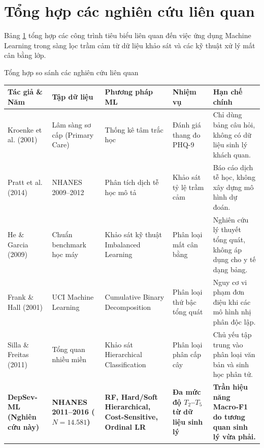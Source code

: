 \section{Tổng hợp các nghiên cứu liên quan}
\label{sec:nghien-cuu-lien-quan}

Bảng \ref{tab:related-works} tổng hợp các công trình tiêu biểu liên quan đến việc ứng dụng Machine Learning trong sàng lọc trầm cảm từ dữ liệu khảo sát và các kỹ thuật xử lý mất cân bằng lớp.

\begin{table}{Tổng hợp so sánh các nghiên cứu liên quan}
\centering
\footnotesize
\setlength{\tabcolsep}{4.5pt}
\label{tab:related-works}
\begin{tabularx}{\textwidth}{p{2.6cm} p{2.2cm} p{2.6cm} p{2.0cm} X}
\toprule
\textbf{Tác giả \& Năm} & \textbf{Tập dữ liệu} & \textbf{Phương pháp ML} & \textbf{Nhiệm vụ} & \textbf{Hạn chế chính} \\
\midrule
Kroenke et al. (2001) \cite{kroenke2001phq} & Lâm sàng sơ cấp (Primary Care) & Thống kê tâm trắc học & Đánh giá thang đo PHQ-9 & Chỉ dùng bảng câu hỏi, không có dữ liệu sinh lý khách quan. \\
\addlinespace
Pratt et al. (2014) \cite{pratt1991discriminant} & NHANES 2009--2012 & Phân tích dịch tễ học mô tả & Khảo sát tỷ lệ trầm cảm & Báo cáo dịch tễ học, không xây dựng mô hình dự đoán. \\
\addlinespace
He \& Garcia (2009) \cite{he2009learning} & Chuẩn benchmark học máy & Khảo sát kỹ thuật Imbalanced Learning & Phân loại mất cân bằng & Nghiên cứu lý thuyết tổng quát, không áp dụng cho y tế dạng bảng. \\
\addlinespace
Frank \& Hall (2001) \cite{frank2001simple} & UCI Machine Learning & Cumulative Binary Decomposition & Phân loại thứ bậc tổng quát & Nguy cơ vi phạm đơn điệu khi các mô hình nhị phân độc lập. \\
\addlinespace
Silla \& Freitas (2011) \cite{silla2011survey} & Tổng quan nhiều miền & Khảo sát Hierarchical Classification & Phân loại phân cấp cây & Chủ yếu tập trung vào phân loại văn bản và sinh học phân tử. \\
\addlinespace
\textbf{DepSev-ML (Nghiên cứu này)} & \textbf{NHANES 2011--2016 ($N=14.581$)} & \textbf{RF, Hard/Soft Hierarchical, Cost-Sensitive, Ordinal LR} & \textbf{Đa mức độ $T_2$--$T_5$ từ dữ liệu sinh lý} & \textbf{Trần hiệu năng Macro-F1 do tương quan sinh lý vừa phải.} \\
\bottomrule
\end{tabularx}
\end{table}

